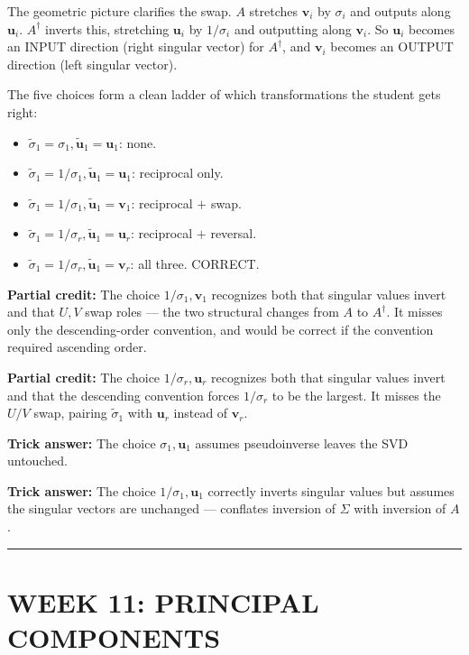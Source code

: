 \documentclass[12pt]{amsart}
\newcommand{\divider}{
  \vspace{-1em}
  \noindent
  \raisebox{-0.15ex}{\textbullet}%
  \hspace{0.5em}%
  \rule[0.5ex]{0.95\textwidth}{1.0pt}%
  \hspace{0.5em}%
  \raisebox{-0.15ex}{\textbullet}%
  \vspace{0em}
}
\begin{document}
The geometric picture clarifies the swap. $A$ stretches $\mathbf{v}_i$ by
$\sigma_i$ and outputs along $\mathbf{u}_i$. $A^\dagger$ inverts this, stretching
$\mathbf{u}_i$ by $1/\sigma_i$ and outputting along $\mathbf{v}_i$.
So $\mathbf{u}_i$ becomes an INPUT direction (right singular vector) for
$A^\dagger$, and $\mathbf{v}_i$ becomes an OUTPUT direction (left singular vector).

The five choices form a clean ladder of which transformations the student gets right:
\begin{itemize}
\item $\tilde\sigma_1 = \sigma_1, \tilde{\mathbf{u}}_1 = \mathbf{u}_1$: none.
\item $\tilde\sigma_1 = 1/\sigma_1, \tilde{\mathbf{u}}_1 = \mathbf{u}_1$: reciprocal only.
\item $\tilde\sigma_1 = 1/\sigma_1, \tilde{\mathbf{u}}_1 = \mathbf{v}_1$: reciprocal $+$ swap.
\item $\tilde\sigma_1 = 1/\sigma_r, \tilde{\mathbf{u}}_1 = \mathbf{u}_r$: reciprocal $+$ reversal.
\item $\tilde\sigma_1 = 1/\sigma_r, \tilde{\mathbf{u}}_1 = \mathbf{v}_r$: all three. CORRECT.
\end{itemize}

\textbf{Partial credit:}
The choice $1/\sigma_1, \mathbf{v}_1$ recognizes both that singular values
invert and that $U, V$ swap roles --- the two structural changes from $A$
to $A^\dagger$. It misses only the descending-order convention, and would
be correct if the convention required ascending order.

\textbf{Partial credit:}
The choice $1/\sigma_r, \mathbf{u}_r$ recognizes both that singular values
invert and that the descending convention forces $1/\sigma_r$ to be the
largest. It misses the $U/V$ swap, pairing $\tilde\sigma_1$ with $\mathbf{u}_r$
instead of $\mathbf{v}_r$.

\textbf{Trick answer:}
The choice $\sigma_1, \mathbf{u}_1$ assumes pseudoinverse leaves the SVD untouched.

\textbf{Trick answer:}
The choice $1/\sigma_1, \mathbf{u}_1$ correctly inverts singular values but
assumes the singular vectors are unchanged --- conflates inversion of $\Sigma$
with inversion of $A$.

\divider

\newpage

\section*{WEEK 11: PRINCIPAL COMPONENTS}
\end{document}
